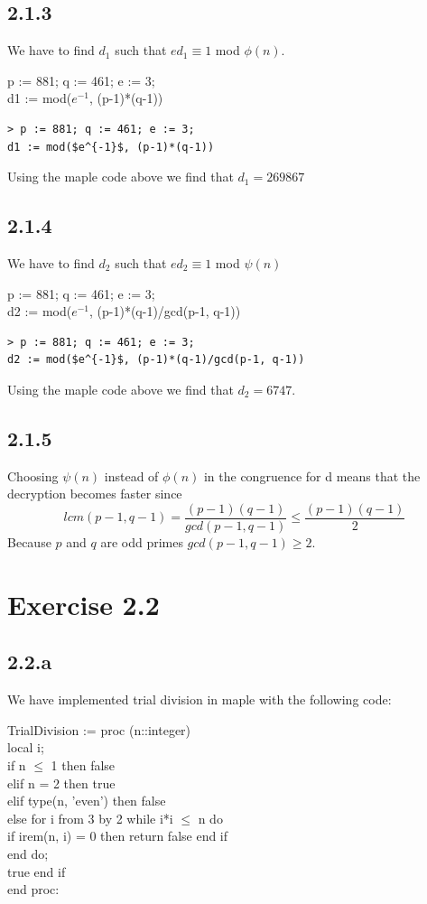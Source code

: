 \documentclass[11pt]{report}
\begin{document}
\subsection*{2.1.3}
We have to find $d_1$ such that $ed_1 \equiv 1$ mod $\phi(n)$.
\begin{mapleinput}
p := 881; q := 461; e := 3; \\
d1 := mod($e^{-1}$, (p-1)*(q-1))
\end{mapleinput}

\begin{lstlisting}[style=Maple]
> p := 881; q := 461; e := 3;
d1 := mod($e^{-1}$, (p-1)*(q-1))
\end{lstlisting}

Using the maple code above we find that $d_1 = 269867$
\subsection*{2.1.4}
We have to find $d_2$ such that $ed_2 \equiv 1$ mod $\psi(n)$

\begin{mapleinput}
p := 881; q := 461; e := 3; \\
d2 := mod($e^{-1}$, (p-1)*(q-1)/gcd(p-1, q-1))
\end{mapleinput}

\begin{lstlisting}[style=Maple]
> p := 881; q := 461; e := 3;
d2 := mod($e^{-1}$, (p-1)*(q-1)/gcd(p-1, q-1))
\end{lstlisting}

Using the maple code above we find that $d_2 = 6747$.
\subsection*{2.1.5}
Choosing $\psi(n)$ instead of $\phi(n)$ in the congruence for d means that the decryption becomes faster since
$$lcm(p-1,q-1)=\frac{(p-1)(q-1)}{gcd(p-1,q-1)} \leq \frac{(p-1)(q-1)}{2}$$
Because $p$ and $q$ are odd primes $gcd(p-1,q-1) \geq 2$. 

\section*{Exercise 2.2}
\subsection*{2.2.a}
We have implemented trial division in maple with the following code:

\begin{mapleinput}
TrialDivision := proc (n::integer) \\
local i; \\
if n $\leq$ 1 then false \\
elif n = 2 then true \\
elif type(n, 'even') then false \\
else for i from 3 by 2 while i*i $\leq$ n do \\
if irem(n, i) = 0 then return false end if \\
end do; \\
true end if \\
end proc:
\end{mapleinput}
\end{document}
